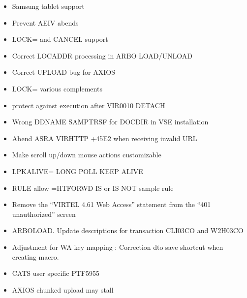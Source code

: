 \documentclass[letterpaper,10pt,english]{sphinxmanual}
\begin{document}
\begin{itemize}
\item {} 
 Samsung tablet support

\item {} 
 Prevent AEIV abends

\item {} 
 LOCK= and CANCEL support

\item {} 
 Correct LOCADDR processing in ARBO LOAD/UNLOAD

\item {} 
 Correct UPLOAD bug for AXIOS

\item {} 
 LOCK= various complements

\item {} 
 protect against execution after VIR0010 DETACH

\item {} 
 Wrong DDNAME SAMPTRSF for DOC\sphinxhyphen{}DIR in VSE installation

\item {} 
 Abend ASRA VIRHTTP +45E2 when receiving invalid URL

\item {} 
 Make scroll up/down mouse actions customizable

\item {} 
 LPKALIVE= LONG POLL KEEP ALIVE

\item {} 
 RULE allow =HTFORWD IS or IS NOT sample rule

\item {} 
 Remove the “VIRTEL 4.61 Web Access” statement from the “401 unauthorized” screen

\item {} 
 ARBOLOAD. Update descriptions for transaction CLI\sphinxhyphen{}03CO and W2H\sphinxhyphen{}03CO

\item {} 
 Adjustment for WA key mapping : Correction dto save shortcut when creating macro.

\item {} 
 CA\sphinxhyphen{}TS user specific PTF5955

\item {} 
 AXIOS chunked upload may stall


\end{itemize}
\end{document}
